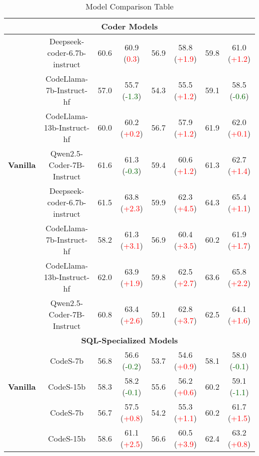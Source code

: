 \begin{table*}[t!]
\begin{tabular}{c | c | c c | c c | c c}
        \midrule
        \multicolumn{8}{c}{\textbf{Coder Models}} \\ \midrule
        
        & Deepseek-coder-6.7b-instruct & 60.6 & 60.9 (\textcolor{red}{0.3}) & 56.9 & 58.8 (\textcolor{red}{+1.9}) & 59.8 & 61.0 (\textcolor{red}{+1.2}) \\
        & CodeLlama-7b-Instruct-hf & 57.0 & 55.7 (\textcolor{darkgreen}{-1.3}) & 54.3 & 55.5 (\textcolor{red}{+1.2}) & 59.1 & 58.5 (\textcolor{darkgreen}{-0.6})\\ 
        & CodeLlama-13b-Instruct-hf & 60.0 & 60.2 (\textcolor{red}{+0.2})& 56.7  & 57.9 (\textcolor{red}{+1.2})& 61.9 & 62.0 (\textcolor{red}{+0.1})\\
        \multirow{-4}{*}{\textbf{Vanilla}} & Qwen2.5-Coder-7B-Instruct & 61.6 & 61.3 (\textcolor{darkgreen}{-0.3}) & 59.4 & 60.6 (\textcolor{red}{+1.2}) & 61.3 & 62.7 (\textcolor{red}{+1.4})\\
        
        \rowcolor{cyan!20}
        & Deepseek-coder-6.7b-instruct & 61.5 & 63.8 (\textcolor{red}{+2.3}) & 59.9 & 62.3 (\textcolor{red}{+4.5}) & 64.3 & 65.4 (\textcolor{red}{+1.1}) \\
        \rowcolor{cyan!20}
        & CodeLlama-7b-Instruct-hf & 58.2 & 61.3 (\textcolor{red}{+3.1}) & 56.9 & 60.4 (\textcolor{red}{+3.5}) & 60.2 & 61.9 (\textcolor{red}{+1.7})\\ 
        \rowcolor{cyan!20}
        & CodeLlama-13b-Instruct-hf & 62.0 & 63.9 (\textcolor{red}{+1.9})& 59.8  & 62.5 (\textcolor{red}{+2.7})& 63.6 & 65.8 (\textcolor{red}{+2.2})\\
        \rowcolor{cyan!20}
        \multirow{-4}{*}{\textbf{CoT}} & Qwen2.5-Coder-7B-Instruct & 60.8 & 63.4 (\textcolor{red}{+2.6}) & 59.1 & 62.8 (\textcolor{red}{+3.7}) & 62.5 & 64.1 (\textcolor{red}{+1.6})\\ \midrule
        
        \multicolumn{8}{c}{\textbf{SQL-Specialized Models}} \\ \midrule
        
        & CodeS-7b & 56.8 & 56.6 (\textcolor{darkgreen}{-0.2}) & 53.7 & 54.6 (\textcolor{red}{+0.9}) & 58.1 & 58.0 (\textcolor{darkgreen}{-0.1})\\ 
        \multirow{-2}{*}{\textbf{Vanilla}} & CodeS-15b & 58.3 & 58.2 (\textcolor{darkgreen}{-0.1}) & 55.6 & 56.2 (\textcolor{red}{+0.6}) & 60.2 & 59.1 (\textcolor{darkgreen}{-1.1})\\
        
        \rowcolor{cyan!20}
        & CodeS-7b & 56.7 & 57.5 (\textcolor{red}{+0.8}) & 54.2 & 55.3 (\textcolor{red}{+1.1}) & 60.2 & 61.7 (\textcolor{red}{+1.5})\\ 
        \rowcolor{cyan!20}
        \multirow{-2}{*}{\textbf{CoT}} & CodeS-15b & 58.6 & 61.1 (\textcolor{red}{+2.5}) & 56.6 & 60.5 (\textcolor{red}{+3.9}) & 62.4 & 63.2 (\textcolor{red}{+0.8})\\
        \bottomrule
    \end{tabular}
    \caption{Model Comparison Table}
    \label{tab:model-comparison}
\end{table*}
\fi

